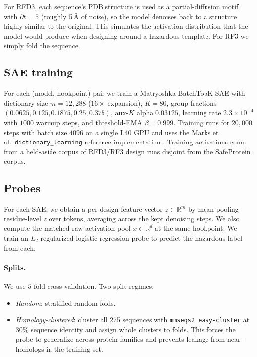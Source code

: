 \documentclass{article}
\theoremstyle{plain}
\theoremstyle{definition}
\theoremstyle{remark}
\begin{document}
For RFD3, each sequence's PDB structure is used as a partial-diffusion motif with $\partial t = 5$ (roughly 5\,\AA{} of noise), so the model denoises back to a structure highly similar to the original. This simulates the activation distribution that the model would produce when designing around a hazardous template. For RF3 we simply fold the sequence.

\subsection{SAE training}

For each (model, hookpoint) pair we train a Matryoshka BatchTopK SAE with dictionary size $m = 12{,}288$ ($16\times$ expansion), $K = 80$, group fractions $(0.0625, 0.125, 0.1875, 0.25, 0.375)$, $\text{aux-}K$ alpha $0.03125$, learning rate $2.3 \times 10^{-4}$ with $1000$ warmup steps, and threshold-EMA $\beta = 0.999$. Training runs for $20{,}000$ steps with batch size $4096$ on a single L40 GPU and uses the Marks et al.\ \texttt{dictionary\_learning} reference implementation \cite{marks2024dictionarylearning}. Training activations come from a held-aside corpus of RFD3/RF3 design runs disjoint from the SafeProtein corpus.

\subsection{Probes}

For each SAE, we obtain a per-design feature vector $\bar{z} \in \mathbb{R}^{m}$ by mean-pooling residue-level $z$ over tokens, averaging across the kept denoising steps. We also compute the matched raw-activation pool $\bar{x} \in \mathbb{R}^{d}$ at the same hookpoint. We train an $L_2$-regularized logistic regression probe to predict the hazardous label from each.

\paragraph{Splits.} We use $5$-fold cross-validation. Two split regimes:
\begin{itemize}
    \item \textit{Random}: stratified random folds.
    \item \textit{Homology-clustered}: cluster all 275 sequences with \texttt{mmseqs2 easy-cluster} at $30\%$ sequence identity \cite{steinegger2017mmseqs2} and assign whole clusters to folds. This forces the probe to generalize across protein families and prevents leakage from near-homologs in the training set.
\end{itemize}
\end{document}
